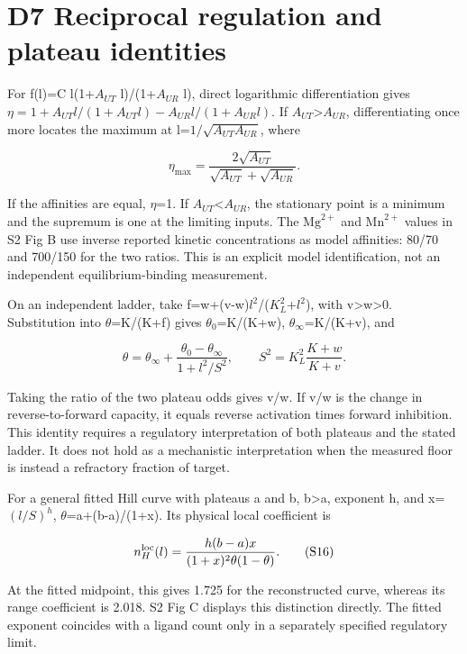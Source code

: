 \documentclass[11pt]{article}
\begin{document}
\section*{D7 Reciprocal regulation and plateau identities}

For f(l)=C l(1+$A_{UT}$ l)/(1+$A_{UR}$ l), direct logarithmic differentiation gives $\eta=1+A_{UT}l/(1+A_{UT}l)-A_{UR}l/(1+A_{UR}l)$. If $A_{UT}$>$A_{UR}$, differentiating once more locates the maximum at l=$1/\sqrt{A_{UT}A_{UR}}$, where


\[
\eta_{\max}=\frac{2\sqrt{A_{UT}}}{\sqrt{A_{UT}}+\sqrt{A_{UR}}}. \tag{S14}
\]

If the affinities are equal, $\eta$=1. If $A_{UT}$<$A_{UR}$, the stationary point is a minimum and the supremum is one at the limiting inputs. The $\mathrm{Mg}^{2+}$ and $\mathrm{Mn}^{2+}$ values in S2 Fig B use inverse reported kinetic concentrations as model affinities: 80/70 and 700/150 for the two ratios. This is an explicit model identification, not an independent equilibrium-binding measurement.


On an independent ladder, take f=w+(v-w)$l^2$/($K_L^2$+$l^2$), with v>w>0. Substitution into $\theta$=K/(K+f) gives $\theta_0$=K/(K+w), $\theta_\infty$=K/(K+v), and


\[
\theta=\theta_\infty+\frac{\theta_0-\theta_\infty}{1+l^2/S^2},\qquad
S^2=K_L^2\frac{K+w}{K+v}. \tag{S15}
\]

Taking the ratio of the two plateau odds gives v/w. If v/w is the change in reverse-to-forward capacity, it equals reverse activation times forward inhibition. This identity requires a regulatory interpretation of both plateaus and the stated ladder. It does not hold as a mechanistic interpretation when the measured floor is instead a refractory fraction of target.


For a general fitted Hill curve with plateaus a and b, b>a, exponent h, and x=$(l/S)^h$, $\theta$=a+(b-a)/(1+x). Its physical local coefficient is


\[
n_H^{\rm loc}(l)=\frac{h(b-a)x}{(1+x)^2\theta(1-\theta)}. \tag{S16}
\]

At the fitted midpoint, this gives 1.725 for the reconstructed curve, whereas its range coefficient is 2.018. S2 Fig C displays this distinction directly. The fitted exponent coincides with a ligand count only in a separately specified regulatory limit.
\end{document}
